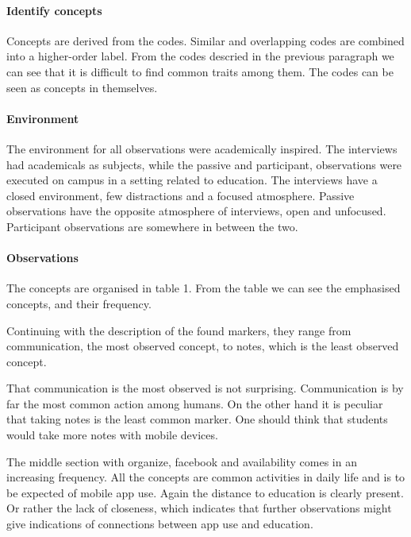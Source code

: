 \documentclass[12pt, a4paper]{article}
\begin{document}
\paragraph{Identify concepts}
Concepts are derived from the codes. Similar and overlapping codes are combined
into a higher-order label. From the codes descried in the previous paragraph we
can see that it is difficult to find common traits among them. The codes can be
seen as concepts in themselves.   

\paragraph{Environment}
The environment for all observations were academically inspired. The interviews
had academicals as subjects, while the passive and participant, observations
were executed on campus in a setting related to education. 
The interviews have a closed environment, few distractions and a focused
atmosphere. Passive observations have the opposite atmosphere of interviews,
open and unfocused. Participant observations are somewhere in between the two. 

\paragraph{Observations}
The concepts are organised in table 1. From the table we can see the emphasised
concepts, and their frequency.  
 
Continuing with the description of the found markers, they range from
communication, the most observed concept,
to notes, which is the least observed concept. 

That communication is the most observed is not surprising. Communication is by
far the most common action among humans. On the other hand it is peculiar that
taking notes is the least common marker. One should think that students would
take more notes with mobile devices. 

The middle section with organize, facebook and availability comes in an
increasing frequency. All the concepts are common activities in daily life and
is to be expected of mobile app use. Again the distance to education is clearly
present. Or rather the lack of closeness, which indicates that further
observations might give indications of connections between app use and
education.
\end{document}

